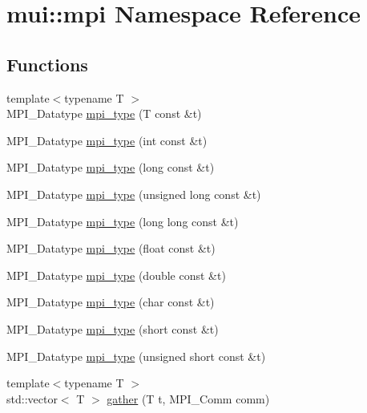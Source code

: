 \hypertarget{namespacemui_1_1mpi}{}\section{mui\+:\+:mpi Namespace Reference}
\label{namespacemui_1_1mpi}
\subsection*{Functions}
\begin{DoxyCompactItemize}
\item 
{\footnotesize template$<$typename T $>$ }\\M\+P\+I\+\_\+\+Datatype \hyperlink{namespacemui_1_1mpi_a1bcee4f8e8ad219e35c9cde47ff37734}{mpi\+\_\+type} (T const \&t)
\item 
M\+P\+I\+\_\+\+Datatype \hyperlink{namespacemui_1_1mpi_a29194aa90e343d4cd85da68ad2c45620}{mpi\+\_\+type} (int const \&t)
\item 
M\+P\+I\+\_\+\+Datatype \hyperlink{namespacemui_1_1mpi_a8704c4f75dbbba3c95b135204a504760}{mpi\+\_\+type} (long const \&t)
\item 
M\+P\+I\+\_\+\+Datatype \hyperlink{namespacemui_1_1mpi_aacc17082deb9136a940e6d945de0c3ef}{mpi\+\_\+type} (unsigned long const \&t)
\item 
M\+P\+I\+\_\+\+Datatype \hyperlink{namespacemui_1_1mpi_abd71cf8a0500db33889fb701f7a9c2be}{mpi\+\_\+type} (long long const \&t)
\item 
M\+P\+I\+\_\+\+Datatype \hyperlink{namespacemui_1_1mpi_a95b75dec7e27a0cd258c6c44217439f1}{mpi\+\_\+type} (float const \&t)
\item 
M\+P\+I\+\_\+\+Datatype \hyperlink{namespacemui_1_1mpi_a8e8b2386273938c8b5958d0951466ee7}{mpi\+\_\+type} (double const \&t)
\item 
M\+P\+I\+\_\+\+Datatype \hyperlink{namespacemui_1_1mpi_a38739aa84aed4f4be4abb67f5de23910}{mpi\+\_\+type} (char const \&t)
\item 
M\+P\+I\+\_\+\+Datatype \hyperlink{namespacemui_1_1mpi_a3749e654c879be165d94e841e51530a4}{mpi\+\_\+type} (short const \&t)
\item 
M\+P\+I\+\_\+\+Datatype \hyperlink{namespacemui_1_1mpi_afb569aa26555121e1243a98a7f152d06}{mpi\+\_\+type} (unsigned short const \&t)
\item 
{\footnotesize template$<$typename T $>$ }\\std\+::vector$<$ T $>$ \hyperlink{namespacemui_1_1mpi_ad81d92d7907ebd2adf2c1efa0dc959a9}{gather} (T t, M\+P\+I\+\_\+\+Comm comm)
\end{DoxyCompactItemize}


